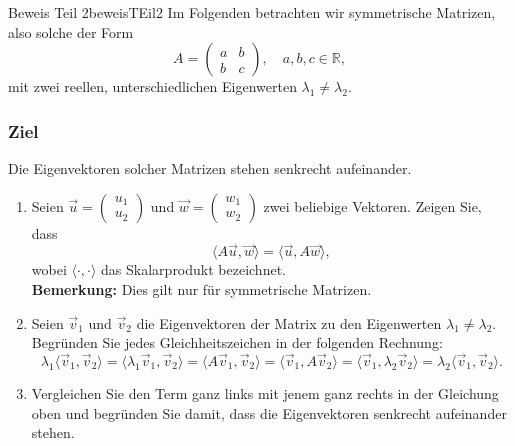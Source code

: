 \begin{LA}
	{Beweis Teil 2}{beweisTEil2}
	\noindent Im Folgenden betrachten wir symmetrische Matrizen, also solche der Form
	\[
		A = \begin{pmatrix}
			a & b \\
			b & c
		\end{pmatrix}, \quad a, b, c \in \mathbb{R},
	\]
	mit zwei reellen, unterschiedlichen Eigenwerten \(\lambda_1 \neq \lambda_2\).

	\subsubsection*{Ziel}
	Die Eigenvektoren solcher Matrizen stehen senkrecht aufeinander.

	\begin{enumerate}
		\item Seien \(\vec{u} = \begin{pmatrix} u_1 \\ u_2 \end{pmatrix}\) und \(\vec{w} = \begin{pmatrix} w_1 \\ w_2 \end{pmatrix}\) zwei beliebige Vektoren. Zeigen Sie, dass
		      \[
			      \langle A \vec{u}, \vec{w} \rangle = \langle \vec{u}, A \vec{w} \rangle,
		      \]
		      wobei \(\langle \cdot, \cdot \rangle\) das Skalarprodukt bezeichnet.\\
		      \textbf{Bemerkung:} Dies gilt nur für symmetrische Matrizen.

		\item Seien \(\vec{v}_1\) und \(\vec{v}_2\) die Eigenvektoren der Matrix zu den Eigenwerten \(\lambda_1 \neq \lambda_2\). Begründen Sie jedes Gleichheitszeichen in der folgenden Rechnung:
		      \[
			      \lambda_1 \langle \vec{v}_1, \vec{v}_2 \rangle = \langle \lambda_1 \vec{v}_1, \vec{v}_2 \rangle = \langle A \vec{v}_1, \vec{v}_2 \rangle = \langle \vec{v}_1, A \vec{v}_2 \rangle = \langle \vec{v}_1, \lambda_2 \vec{v}_2 \rangle = \lambda_2 \langle \vec{v}_1, \vec{v}_2 \rangle.
		      \]

		\item Vergleichen Sie den Term ganz links mit jenem ganz rechts in der Gleichung oben und begründen Sie damit, dass die Eigenvektoren senkrecht aufeinander stehen.
	\end{enumerate}
\end{LA}


\clearpage

